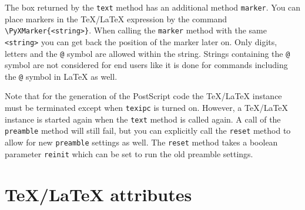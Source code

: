 The box returned by the \verb|text| method has an additional method
\verb|marker|. You can place markers in the \TeX/\LaTeX{} expression
by the command \verb|\PyXMarker{<string>}|. When calling the
\verb|marker| method with the same \verb|<string>| you can get back the
position of the marker later on. Only digits, letters and the \verb|@|
symbol are allowed within the string. Strings containing the \verb|@|
symbol are not considered for end users like it is done for commands
including the \verb|@| symbol in \LaTeX{} as well.

Note that for the generation of the PostScript code the \TeX/\LaTeX{}
instance must be terminated except when \verb|texipc| is turned on.
However, a \TeX/\LaTeX{} instance is started again when the
\verb|text| method is called again. A call of the \verb|preamble|
method will still fail, but you can explicitly call the \verb|reset|
method to allow for new \verb|preamble| settings as well. The
\verb|reset| method takes a boolean parameter \verb|reinit| which can
be set to run the old preamble settings.

\section{\TeX/\LaTeX{} attributes}

